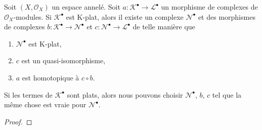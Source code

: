 {\begin{lemma}

\label{lemma-factor-through-K-flat}

Soit $(X, \mathcal{O}_X)$ un espace annelé. Soit $a : \mathcal{K}^\bullet \to \mathcal{L}^\bullet$ un morphisme de complexes de $\mathcal{O}_X$-modules. Si $\mathcal{K}^\bullet$ est K-plat, alors il existe un complexe $\mathcal{N}^\bullet$ et des morphismes de complexes
$b : \mathcal{K}^\bullet \to \mathcal{N}^\bullet$
et $c : \mathcal{N}^\bullet \to \mathcal{L}^\bullet$ de telle manière que

\begin{enumerate}

\item  $\mathcal{N}^\bullet$ est K-plat,
\item  $c$ est un quasi-isomorphisme,
\item  $a$ est homotopique à $c \circ b$.

\end{enumerate}

Si les termes de $\mathcal{K}^\bullet$ sont plats, alors nous pouvons choisir
$\mathcal{N}^\bullet$, $b$, $c$
tel que la même chose est vraie pour $\mathcal{N}^\bullet$.

\end{lemma}

\begin{proof}


\end{proof}}
